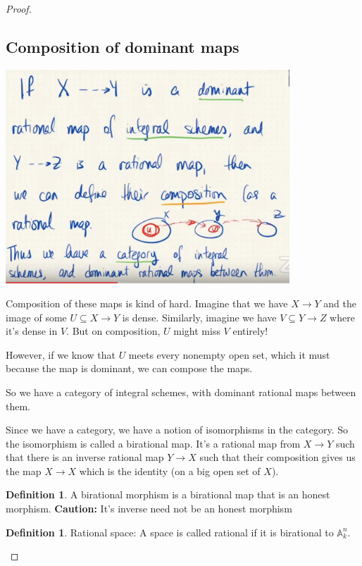 \documentclass{book}
\newcommand{\A}{\ensuremath{\mathbb{A}}}
\theoremstyle{definition}
\newtheorem{definition}[theorem]{Definition}
\begin{document}
\begin{proof}
\subsection{Composition of dominant maps}

\includegraphics[width=0.8\textwidth]{./category-of-rational-maps.png}

Composition of these maps is kind of hard. Imagine that we have $X \rightarrow Y$
and the image of some $U \subseteq X \rightarrow Y$ is dense. Similarly, imagine
we have $V \subseteq Y \rightarrow Z$ where it's dense in $V$. But on composition,
$U$ might miss $V$ entirely!

However, if we know that $U$ meets every nonempty open set, which it must because
the map is dominant, we can compose the maps. 

So we have a category of integral schemes, with dominant rational maps
between them.

Since we have a category, we have a notion of isomorphisms in the category.
So the isomorphism is called a birational map. It's a rational map from $X \rightarrow Y$
such that there is an inverse rational map $Y \rightarrow X$ such that their composition
gives us the map $X \rightarrow X$ which is the identity (on a big open set of $X$).

\begin{definition}
A birational morphism is a birational map that is an honest morphism.
\textbf{Caution:} It's inverse need not be an honest morphism
\end{definition}


\begin{definition}
Rational space: A space is called rational if it is birational to $\A_k^n$.
\end{definition}


\end{proof}
\end{document}
